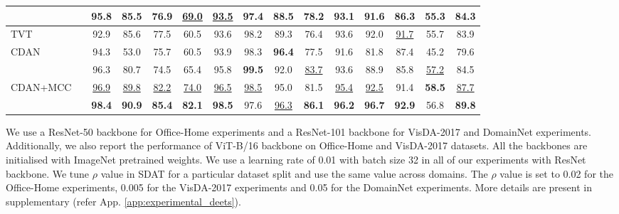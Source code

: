 \documentclass[table,dvipsnames]{article}
\theoremstyle{plain}
\theoremstyle{definition}
\theoremstyle{remark}
\begin{document}
\begin{table*}[ht!]
\begin{adjustbox}{max width=\textwidth}
\begin{tabular}{l|c|cccccccccccc|c}
		\cellcolor{mygray}{CDAN+MCC w/ SDAT} &&   \cellcolor{mygray}\textbf{95.8} & \cellcolor{mygray}\textbf{85.5} & \cellcolor{mygray}76.9 &\cellcolor{mygray}\underline{69.0} & \cellcolor{mygray}\underline{93.5} & \cellcolor{mygray}\textbf{97.4} & \cellcolor{mygray}88.5 & \cellcolor{mygray}78.2 & \cellcolor{mygray}\textbf{93.1} & \cellcolor{mygray}\textbf{91.6} & \cellcolor{mygray}86.3 & \cellcolor{mygray}\textbf{55.3} & \cellcolor{mygray}\textbf{84.3}\\ \hline\hline
TVT \cite{yang2021tvt} &\parbox[t]{2mm}{} & 92.9 & 85.6 & 77.5 & 60.5 & 93.6 & 98.2 & 89.3 & 76.4 & 93.6 & 92.0 & \underline{91.7} & 55.7 & 83.9 \\
		{CDAN} & & 94.3 & 53.0 & 75.7 & 60.5 & 93.9 & 98.3 & \textbf{96.4} & 77.5 & 91.6 & 81.8 & 87.4 & 45.2 & 79.6\\
		 & &  96.3 & 80.7 & 74.5 & 65.4 & 95.8 & \textbf{99.5} & 92.0 & \underline{83.7} & 93.6 & 88.9 & 85.8 & \underline{57.2} & 84.5\\
		{CDAN+MCC} &&   \underline{96.9} & \underline{89.8} & \underline{82.2} & \underline{74.0} & \underline{96.5} & \underline{98.5} & 95.0 & 81.5 & \underline{95.4}& \underline{92.5} & 91.4 & \textbf{58.5} & \underline{87.7}\\
		 && \textbf{98.4} & \textbf{90.9} & \textbf{85.4} & \textbf{82.1} & \textbf{98.5} & 97.6 & \underline{96.3} & \textbf{86.1} & \textbf{96.2} & \textbf{96.7} & \textbf{92.9} & 56.8 & \textbf{89.8} \\ 
		\hline
		
\end{tabular}\end{adjustbox}
\end{table*}

We use a ResNet-50 backbone for Office-Home experiments and a ResNet-101 backbone for VisDA-2017 and DomainNet experiments. Additionally, we also report the performance of ViT-B/16 \cite{dosovitskiy2020image} backbone on Office-Home and VisDA-2017 datasets. All the backbones are initialised with ImageNet pretrained weights. We use a learning rate of 0.01 with batch size 32 in all of our experiments with ResNet backbone. We tune $\rho$ value in SDAT for a particular dataset split and use the same value across domains. The $\rho$ value is set to 0.02 for the Office-Home experiments, 0.005 for the VisDA-2017 experiments and 0.05 for the DomainNet experiments. More details are present in supplementary (refer App. \ref{app:experimental_deets}).
\end{document}
